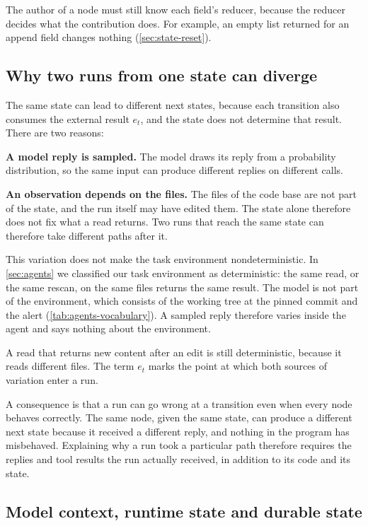 The author of a node must still know each field's reducer, because the reducer decides what the
contribution does. For example, an empty list returned for an append field changes nothing
(\cref{sec:state-reset}).

\subsection{Why two runs from one state can diverge}
\label{sec:state-diverge}

The same state can lead to different next states, because each transition also consumes the
external result $e_t$, and the state does not determine that result. There are two reasons:
\bi
\item \textbf{A model reply is sampled.} The model draws its reply from a probability distribution,
so the same input can produce different replies on different calls.
\item \textbf{An observation depends on the files.} The files of the code base are not part of the
state, and the run itself may have edited them. The state alone therefore does not fix what a read
returns.
\ei
Two runs that reach the same state can therefore take different paths after it.

This variation does not make the task environment nondeterministic. In \cref{sec:agents} we
classified our task environment as deterministic: the same read, or the same rescan, on the same
files returns the same result. The model is not part of the environment, which consists of the
working tree at the pinned commit and the alert (\cref{tab:agents-vocabulary}). A sampled reply therefore varies inside the agent and says nothing about
the environment.

A read that returns new content after an edit is still deterministic, because it reads different
files. The term $e_t$ marks the point at which both sources of variation enter a run.

A consequence is that a run can go wrong at a transition even when every node behaves correctly.
The same node, given the same state, can produce a different next state because it received a
different reply, and nothing in the program has misbehaved. Explaining why a run took a particular
path therefore requires the replies and tool results the run actually received, in addition to its
code and its state.

\subsection{Model context, runtime state and durable state}
\label{sec:state-records}

